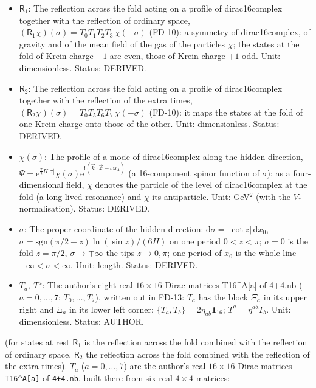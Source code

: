 \documentclass[
  10pt,
]{article}
\providecommand{\tightlist}{%
  \setlength{\itemsep}{0pt}\setlength{\parskip}{0pt}}
\begin{document}
\begin{itemize}
\tightlist
\item
  \(\mathsf{R}_1\): The reflection across the fold acting on a profile
  of dirac16complex together with the reflection of ordinary space,
  \((\mathsf{R}_1\chi)(\sigma) = T_0T_1T_2T_3\,\chi(-\sigma)\) (FD-10):
  a symmetry of dirac16complex, of gravity and of the mean field of the
  gas of the particles \(\chi\); the states at the fold of Krein charge
  \(-1\) are even, those of Krein charge \(+1\) odd. Unit:
  dimensionless. Status: DERIVED.
\item
  \(\mathsf{R}_2\): The reflection across the fold acting on a profile
  of dirac16complex together with the reflection of the extra times,
  \((\mathsf{R}_2\chi)(\sigma) = T_0T_5T_6T_7\,\chi(-\sigma)\) (FD-10):
  it maps the states at the fold of one Krein charge onto those of the
  other. Unit: dimensionless. Status: DERIVED.
\item
  \(\chi(\sigma)\): The profile of a mode of dirac16complex along the
  hidden direction,
  \(\Psi = \mathrm{e}^{\frac72H\lvert\sigma\rvert}\chi(\sigma)\mathrm{e}^{\mathrm{i}(\vec k\cdot\vec x - \omega x_4)}\)
  (a 16-component spinor function of \(\sigma\)); as a four-dimensional
  field, \(\chi\) denotes the particle of the level of dirac16complex at
  the fold (a long-lived resonance) and \(\bar\chi\) its antiparticle.
  Unit: GeV\(^{2}\) (with the \(V_*\) normalisation). Status: DERIVED.
\item
  \(\sigma\): The proper coordinate of the hidden direction:
  \(\mathrm{d}\sigma = \lvert\cot z\rvert\,\mathrm{d}x_0\),
  \(\sigma = \mathrm{sgn}(\pi/2 - z)\ln(\sin z)/(6H)\) on one period
  \(0 < z < \pi\); \(\sigma = 0\) is the fold \(z = \pi/2\),
  \(\sigma \to \mp\infty\) the tips \(z \to 0, \pi\); one period of
  \(x_0\) is the whole line \(-\infty < \sigma < \infty\). Unit: length.
  Status: DERIVED.
\item
  \(T_a,\ T^a\): The author's eight real \(16 \times 16\) Dirac matrices
  T16\^{}A{[}a{]} of 4+4.nb (\(a = 0, \dots, 7\); \(T_0, \dots, T_7\)),
  written out in FD-13: \(T_a\) has the block \(\bar\Xi_a\) in its upper
  right and \(\Xi_a\) in its lower left corner;
  \(\{T_a, T_b\} = 2\eta_{ab}\mathbf{1}_{16}\); \(T^a = \eta^{ab}T_b\).
  Unit: dimensionless. Status: AUTHOR.
\end{itemize}

(for states at rest \(\mathsf{R}_1\) is the reflection across the fold
combined with the reflection of ordinary space, \(\mathsf{R}_2\) the
reflection across the fold combined with the reflection of the extra
times). \(T_a\) (\(a = 0, \dots, 7\)) are the author's real
\(16 \times 16\) Dirac matrices \texttt{T16\^{}A{[}a{]}} of
\texttt{4+4.nb}, built there from six real \(4 \times 4\) matrices:
\end{document}
